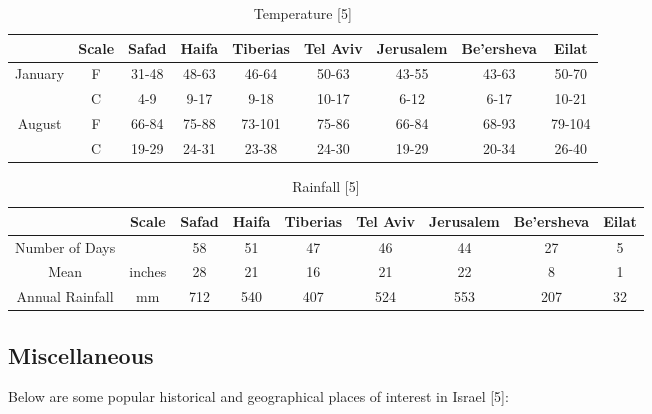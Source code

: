 \documentclass[10pt]{article}
\begin{document}
\begin{table}[H]
	\centering
	\caption{Temperature [5]}
	\begin{adjustbox}{width=\textwidth}
	\begin{tabular}{@{}ccccccccc@{}}
		\toprule
			& Scale	& Safad	& Haifa	& Tiberias	& Tel Aviv	& Jerusalem	& Be'ersheva	& Eilat\\
		\midrule
		January	& F	& 31-48	& 48-63	& 46-64		& 50-63		& 43-55		& 43-63		& 50-70\\
			& C	& 4-9	& 9-17	& 9-18		& 10-17		& 6-12		& 6-17		& 10-21\\
		August	& F	& 66-84	& 75-88	& 73-101		& 75-86		& 66-84		& 68-93		& 79-104\\
			& C	& 19-29	& 24-31	& 23-38		& 24-30		& 19-29		& 20-34		& 26-40\\
		\bottomrule
	\end{tabular}
	\end{adjustbox}
\end{table}

\begin{table}[H]
	\centering
	\caption{Rainfall [5]}
	\begin{adjustbox}{width=\textwidth}
	\begin{tabular}{@{}ccccccccc@{}}
		\toprule
				& Scale	& Safad	& Haifa	& Tiberias	& Tel Aviv	& Jerusalem	& Be'ersheva	& Eilat\\
		\midrule
		Number of Days	&	& 58	& 51	& 47		& 46		& 44		& 27		& 5\\
		Mean		& inches	& 28	& 21	& 16		& 21		& 22		& 8		& 1\\
		Annual Rainfall	& mm	& 712	& 540	& 407		& 524		& 553		& 207		& 32\\
		\bottomrule
	\end{tabular}
	\end{adjustbox}
\end{table}

\subsection{Miscellaneous}
Below are some popular historical and geographical places of interest in Israel [5]:
\end{document}
